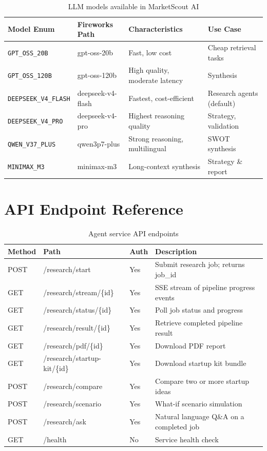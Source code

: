 \documentclass[12pt,a4paper,oneside]{book}
\begin{document}
\begin{table}[H]
\centering
\caption{LLM models available in MarketScout AI}
\label{tab:llm_models}
\begin{tabularx}{\textwidth}{llXl}
\toprule
\textbf{Model Enum} & \textbf{Fireworks Path} & \textbf{Characteristics} & \textbf{Use Case} \\
\midrule
\texttt{GPT\_OSS\_20B}    & gpt-oss-20b        & Fast, low cost          & Cheap retrieval tasks \\
\texttt{GPT\_OSS\_120B}   & gpt-oss-120b       & High quality, moderate latency & Synthesis \\
\texttt{DEEPSEEK\_V4\_FLASH} & deepseek-v4-flash & Fastest, cost-efficient & Research agents (default) \\
\texttt{DEEPSEEK\_V4\_PRO}  & deepseek-v4-pro  & Highest reasoning quality & Strategy, validation \\
\texttt{QWEN\_V37\_PLUS}  & qwen3p7-plus       & Strong reasoning, multilingual & SWOT synthesis \\
\texttt{MINIMAX\_M3}      & minimax-m3         & Long-context synthesis  & Strategy \& report \\
\bottomrule
\end{tabularx}
\end{table}

\chapter{API Endpoint Reference}
\label{app:api}

\begin{table}[H]
\centering
\caption{Agent service API endpoints}
\label{tab:api_endpoints}
\begin{tabularx}{\textwidth}{lllX}
\toprule
\textbf{Method} & \textbf{Path} & \textbf{Auth} & \textbf{Description} \\
\midrule
POST & /research/start             & Yes & Submit research job; returns job\_id \\
GET  & /research/stream/\{id\}     & Yes & SSE stream of pipeline progress events \\
GET  & /research/status/\{id\}     & Yes & Poll job status and progress \\
GET  & /research/result/\{id\}     & Yes & Retrieve completed pipeline result \\
GET  & /research/pdf/\{id\}        & Yes & Download PDF report \\
GET  & /research/startup-kit/\{id\} & Yes & Download startup kit bundle \\
POST & /research/compare           & Yes & Compare two or more startup ideas \\
POST & /research/scenario          & Yes & What-if scenario simulation \\
POST & /research/ask               & Yes & Natural language Q\&A on a completed job \\
GET  & /health                     & No  & Service health check \\
\bottomrule
\end{tabularx}
\end{table}
\end{document}
